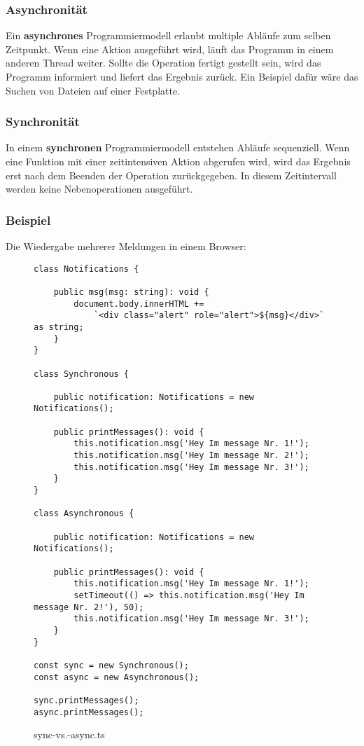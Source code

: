 \subsubsection{Asynchronität}
Ein \textbf{asynchrones} Programmiermodell erlaubt multiple Abläufe zum selben Zeitpunkt. Wenn eine Aktion ausgeführt wird, läuft das Programm in einem anderen \glqq Thread\grqq{} weiter. Sollte die Operation fertigt gestellt sein, wird das Programm informiert und liefert das Ergebnis zurück. Ein Beispiel dafür wäre das Suchen von Dateien auf einer Festplatte.\cite{asynchronitaet} \\

\subsubsection{Synchronität}
In einem \textbf{synchronen} Programmiermodell entstehen Abläufe sequenziell. Wenn eine Funktion mit einer zeitintensiven Aktion abgerufen wird, wird das Ergebnis erst nach dem Beenden der Operation zurückgegeben. In diesem Zeitintervall werden keine Nebenoperationen ausgeführt.\cite{asynchronitaet} \\

\subsubsection{Beispiel}
Die Wiedergabe mehrerer Meldungen in einem Browser:

\begin{figure}[H]
\begin{lstlisting}
class Notifications {

    public msg(msg: string): void {
        document.body.innerHTML +=
            `<div class="alert" role="alert">${msg}</div>` as string;
    }
}

class Synchronous {

    public notification: Notifications = new Notifications();

    public printMessages(): void {
        this.notification.msg('Hey Im message Nr. 1!');
        this.notification.msg('Hey Im message Nr. 2!');
        this.notification.msg('Hey Im message Nr. 3!');
    }
}

class Asynchronous {

    public notification: Notifications = new Notifications();

    public printMessages(): void {
        this.notification.msg('Hey Im message Nr. 1!');
        setTimeout(() => this.notification.msg('Hey Im message Nr. 2!'), 50);
        this.notification.msg('Hey Im message Nr. 3!');
    }
}

const sync = new Synchronous();
const async = new Asynchronous();

sync.printMessages();
async.printMessages();
\end{lstlisting}
\caption{sync-vs.-async.ts}
\end{figure}

